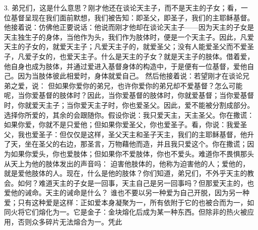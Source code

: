 3.   弟兄们，这是什么意思？刚才他还在谈论天主子，而不是天主的子女；看，一位基督呈现在我们面前默想，我们被告知：即圣父，即圣子，我们的主耶稣基督。他接着说：仿佛他正要说话：他说而刚才他却在谈论天主子——因为天主的子女是天主独生子的身体，当他作为头，我们作为肢体时，便是一个天主子。因此，凡爱天主的子女的，就爱天主子；凡爱天主子的，就爱圣父；没有人能爱圣父而不爱圣子，凡爱子女的，也爱天主子。什么是天主的子女？就是天主子的肢体。借着爱，他自身也成为肢体，并通过爱进入基督身体的构造中，于是便有一位基督，爱他自己。因为当肢体彼此相爱时，身体就爱自己。  然后他接着说：若望刚才在谈论兄弟之爱，说：  但如果你爱你的弟兄，也许你爱你的弟兄却不爱基督？怎么可能呢，当你爱基督的肢体时？因此，当你爱基督的肢体时，你就爱基督；当你爱基督时，你就爱天主子；当你爱天主子时，你也爱圣父。因此，爱不能被分割成部分。选择你所爱的，其余的会跟随你。假设你说：我只爱天主，天主圣父。你在撒谎：如果你爱，你就不是只爱他；但如果你爱圣父，你也爱圣子。看，你说：我爱圣父，我也爱圣子：但仅仅是这样，圣父天主和圣子天主，我们的主耶稣基督，他升了天，坐在圣父的右边，那圣言，万物藉他而造，并且我只爱这个。你在撒谎；因为如果你爱头，你也爱肢体；但如果你不爱肢体，你也不爱头。难道你不畏惧那头从天上为他的肢体发出的声音吗：  迫害他肢体的，他称为迫害他的人；爱他的，就是爱他肢体的人。现在，什么是他的肢体？你们知道，弟兄们，不外乎天主的教会。如何？难道天主的子女是一回事，天主自己是另一回事吗？但那爱天主的，也爱他的诫命。天主的诫命是什么？  谁也不要以另一种爱为自己开脱，因为另一种爱；只有这种爱是这样：正如爱本身凝聚为一，所有依附于它的也被合而为一，如同火将它们熔化为一。它是金子：金块熔化后成为某一种东西。但除非的热火被应用，否则众多碎片无法熔合为一。凭此\par

